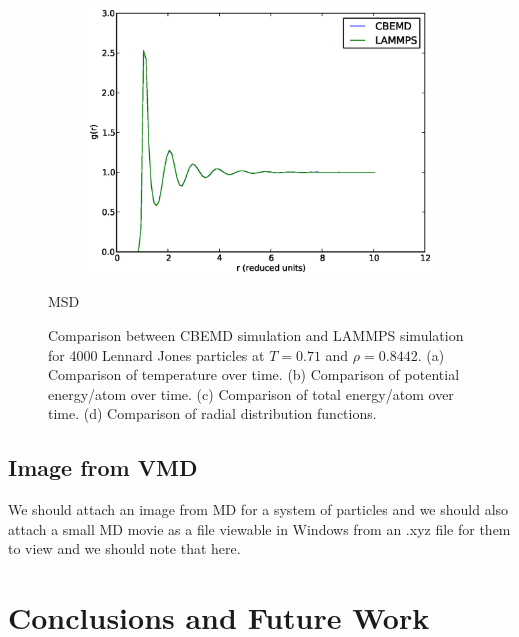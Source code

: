 \begin{figure}[H]
\begin{subfigure}{0.5\textwidth}
	\caption{}
	\end{subfigure}
	\begin{subfigure}{0.5\textwidth}
	\includegraphics[width=\textwidth]{gr_compare}
	\caption{}
	\end{subfigure}
	\caption{Comparison between CBEMD simulation and LAMMPS simulation for 4000 Lennard Jones particles at $T=0.71$ and $\rho=0.8442$. (a) Comparison of temperature over time. (b) Comparison of potential energy/atom over time. (c) Comparison of total energy/atom over time. (d) Comparison of radial distribution functions. }
	\label{fig:lmp_compare}

        MSD
\end{figure}

\subsection{Image from VMD}
We should attach an image from MD for a system of particles and we should also attach a small MD movie as a file viewable in Windows from an .xyz file for them to view and we should note that here.

\section{Conclusions and Future Work}

\pagebreak





